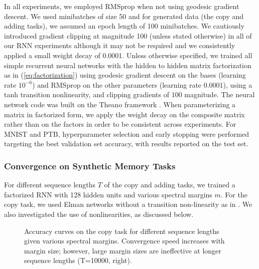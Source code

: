 \documentclass{article} %
\begin{document}
In all experiments, we employed RMSprop \citep{Tieleman2012} when not using geodesic gradient descent. We used minibatches of size 50 and for generated data (the copy and adding tasks), we assumed an epoch length of 100 minibatches. We cautiously introduced gradient clipping at magnitude 100 (unless stated otherwise) in all of our RNN experiments although it may not be required and we consistently applied a small weight decay of 0.0001. Unless otherwise specified, we trained all simple recurrent neural networks with the hidden to hidden matrix factorization as in (\ref{eq:factorization}) using geodesic gradient descent on the bases (learning rate $10^{-6}$) and RMSprop on the other parameters (learning rate 0.0001), using a tanh transition nonlinearity, and clipping gradients of 100 magnitude. The neural network code was built on the Theano framework \citep{2016arXiv160502688short}. When parameterizing a matrix in factorized form, we apply the weight decay on the composite matrix rather than on the factors in order to be consistent across experiments. For MNIST and PTB, hyperparameter selection and early stopping were performed targeting the best validation set accuracy, with results reported on the test set.

\subsubsection{Convergence on Synthetic Memory Tasks}

For different sequence lengths ${\mathit{T}}$ of the copy and adding tasks, we trained a factorized RNN with 128 hidden units and various spectral margins ${\mathit{m}}$. For the copy task, we used Elman networks without a transition non-linearity as in \citet{henaff2016orthogonal}. We also investigated the use of nonlinearities, as discussed below.

\begin{figure*}[htb!]
\centering
{}
\caption{
Accuracy curves on the copy task for different sequence lengths given various spectral margins. Convergence speed increases with margin size; however, large margin sizes are ineffective at longer sequence lengths (T=10000, right).
}
\label{fig:copy_acc}
\end{figure*}
\end{document}
